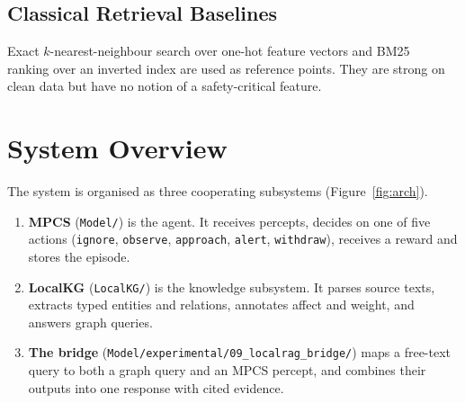 \documentclass[12pt,a4paper,oneside]{report}
\newcommand{\code}[1]{\texttt{\small #1}}
\begin{document}
\section{Classical Retrieval Baselines}
Exact $k$-nearest-neighbour search over one-hot feature vectors and BM25~\cite{robertson2009} ranking over an inverted index are used as reference points. They are strong on clean data but have no notion of a safety-critical feature.

\chapter{System Overview}\label{ch:overview}
The system is organised as three cooperating subsystems (Figure~\ref{fig:arch}).

\begin{enumerate}
  \item \textbf{MPCS} (\code{Model/}) is the agent. It receives percepts, decides on one of five actions (\code{ignore}, \code{observe}, \code{approach}, \code{alert}, \code{withdraw}), receives a reward and stores the episode.
  \item \textbf{LocalKG} (\code{LocalKG/}) is the knowledge subsystem. It parses source texts, extracts typed entities and relations, annotates affect and weight, and answers graph queries.
  \item \textbf{The bridge} (\code{Model/experimental/09\_localrag\_bridge/}) maps a free-text query to both a graph query and an MPCS percept, and combines their outputs into one response with cited evidence.
\end{enumerate}
\end{document}
